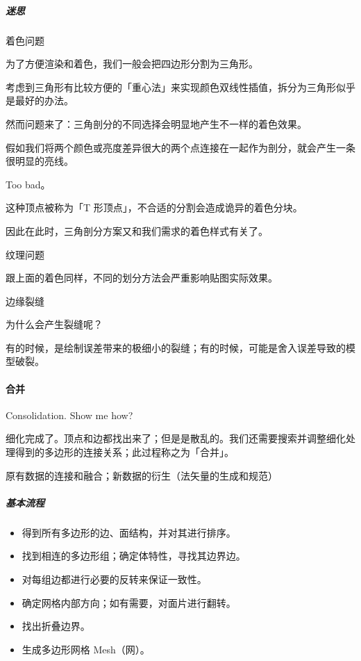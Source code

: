 \documentclass[
]{article}
\begin{document}
\hypertarget{header-n138}{%
\subparagraph{迷思}\label{header-n138}}

着色问题

为了方便渲染和着色，我们一般会把四边形分割为三角形。

考虑到三角形有比较方便的「重心法」来实现颜色双线性插值，拆分为三角形似乎是最好的办法。

然而问题来了：三角剖分的不同选择会明显地产生不一样的着色效果。

假如我们将两个颜色或亮度差异很大的两个点连接在一起作为剖分，就会产生一条很明显的亮线。

Too bad。

这种顶点被称为「T 形顶点」，不合适的分割会造成诡异的着色分块。

因此在此时，三角剖分方案又和我们需求的着色样式有关了。

纹理问题

跟上面的着色同样，不同的划分方法会严重影响贴图实际效果。

边缘裂缝

为什么会产生裂缝呢？

有的时候，是绘制误差带来的极细小的裂缝；有的时候，可能是舍入误差导致的模型破裂。

\hypertarget{header-n152}{%
\paragraph{合并}\label{header-n152}}

Consolidation. Show me how?

细化完成了。顶点和边都找出来了；但是是散乱的。我们还需要搜索并调整细化处理得到的多边形的连接关系；此过程称之为「合并」。

原有数据的连接和融合；新数据的衍生（法矢量的生成和规范）

\hypertarget{header-n156}{%
\subparagraph{基本流程}\label{header-n156}}

\begin{itemize}
\item
  得到所有多边形的边、面结构，并对其进行排序。
\item
  找到相连的多边形组；确定体特性，寻找其边界边。
\item
  对每组边都进行必要的反转来保证一致性。
\item
  确定网格内部方向；如有需要，对面片进行翻转。
\item
  找出折叠边界。
\item
  生成多边形网格 Mesh（网）。
\end{itemize}
\end{document}
